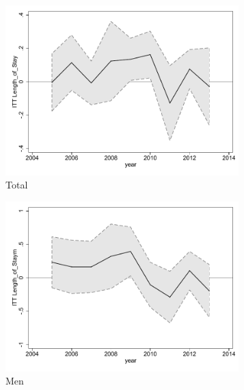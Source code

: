 \documentclass[a4paper ]{article}
\begin{document}
\begin{figure}[h!]
	\centering
	\begin{subfigure}[t]{0.31\textwidth}
		\centering
		\includegraphics[width=0.99\textwidth]{R1_LC_Length_of_Stay}
		\caption{Total}		
	\end{subfigure}
	\begin{subfigure}[t]{0.31\textwidth}
		\centering
		\includegraphics[width=0.99\textwidth]{R1_LC_Length_of_Staym}
		\caption{Men}		
	\end{subfigure}
	\quad
	\begin{subfigure}[t]{0.31\textwidth}
		\centering

\end{subfigure}
\end{figure}
\end{document}
